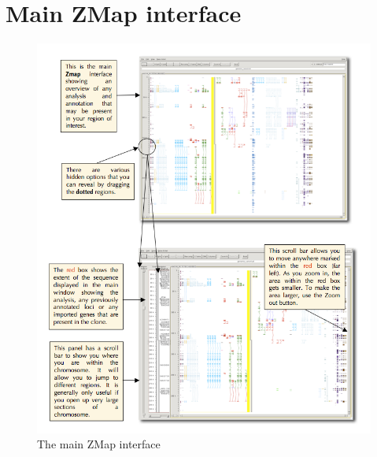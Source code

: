 \documentclass[letterpaper]{article}
\begin{document}
\section{Main ZMap interface}

\begin{figure}
\centering
\color[rgb]{0.30980393,0.5058824,0.7411765}
\includegraphics[width=15.231cm]{img_main_interface.png}
\caption{The main ZMap interface}
\end{figure}
\end{document}
